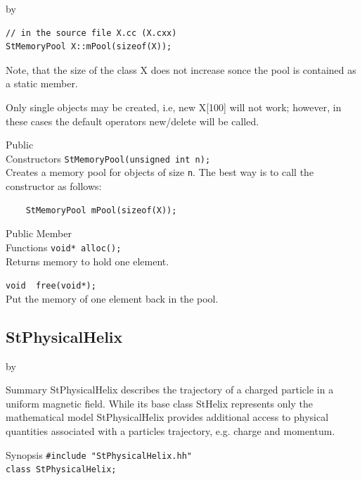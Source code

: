 \documentclass[twoside]{article}
\newcommand{\entrylabel}[1]{\mbox{\textbf{{#1}}}\hfil}%
\newenvironment{entry}
{\begin{list}{}%
    {\renewcommand{\makelabel}{\entrylabel}%
     \setlength{\labelwidth}{90pt}%
     \setlength{\leftmargin}{\labelwidth}
     \advance\leftmargin by \labelsep%
      }%
    }%
  {\end{list}}
\newcommand{\Entrylabel}[1]%
{\raisebox{0pt}[1ex][0pt]{\makebox[\labelwidth][l]%
    {\parbox[t]{\labelwidth}{\hspace{0pt}\textbf{{#1}}}}}}
\newenvironment{Entry}%
{\renewcommand{\entrylabel}{\Entrylabel}\begin{entry}}%
  {\end{entry}}
\begin{document}
\begin{description}
\begin{Entry}
\begin{verbatim}
// in the source file X.cc (X.cxx)
StMemoryPool X::mPool(sizeof(X));
\end{verbatim}

Note, that the size of the class X does not increase
sonce the pool is contained as a static member.

Only single objects may be created,
i.e, new X[100] will not work; however, in these cases the
default operators new/delete will be called.


\item[Public\\ Constructors]
    \verb+StMemoryPool(unsigned int n);+\\
    Creates a memory pool for objects of
    size \texttt{n}. The best way is to
    call the constructor as follows:
\begin{verbatim}
    StMemoryPool mPool(sizeof(X));
\end{verbatim}
    
\item[Public Member\\ Functions]
    \verb+void* alloc();+\\
    Returns memory to hold one element.
    
    \verb+void  free(void*);+\\
    Put the memory of one element back in the pool.
\end{Entry}   
\clearpage

%
%
\subsection{StPhysicalHelix } \label{StPhysicalHelix}
\begin{Entry}
\item[Summary]
    StPhysicalHelix describes the trajectory of a charged particle in a
    uniform magnetic field. While its base class StHelix 
    represents only the mathematical model StPhysicalHelix provides
    additional access to physical quantities associated with a particles
    trajectory, e.g. charge and momentum.

\item[Synopsis]
    \verb+#include "StPhysicalHelix.hh"+\\
    \verb+class StPhysicalHelix;+    
    

\end{Entry}
\end{description}
\end{document}
